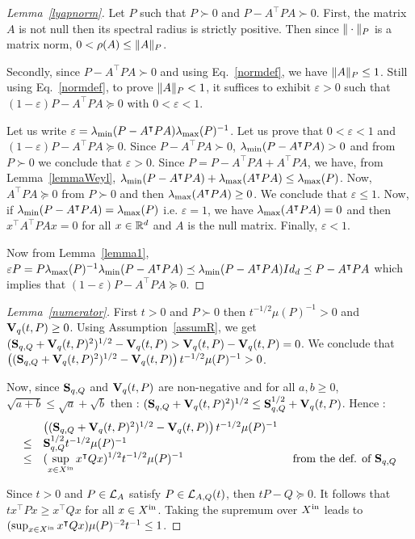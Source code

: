 \documentclass[10pt]{llncs}
\begin{document}
\begin{proof}[Lemma~\ref{lyapnorm}]
Let $P$ such that $P\succ 0$ and $P-A^\intercal P A\succ 0$.  First, the matrix $A$ is not null then its spectral radius is strictly positive. Then since $\| \cdot\|_P$ is a matrix norm, $0<\rho(A) \leq \| A\|_P$.

Secondly, since $P-A^\intercal P A\succ 0$ and using Eq.~\eqref{normdef}, we have $\| A\|_P\leq 1$. Still using Eq.~\eqref{normdef}, to prove $\| A\|_P<1$, it suffices to exhibit $\varepsilon>0$ such that $(1-\varepsilon) P-A^\intercal P A\succeq 0$ with $0<\varepsilon<1$. 

Let us write $\varepsilon=\lambda_{\operatorname{min}}(P-A^\intercal P A) \lambda_{\operatorname{max}}(P)^{-1}$. Let us prove that $0<\varepsilon<1$ and $(1-\varepsilon) P-A^\intercal P A\succeq 0$.  Since $P-A^\intercal P A\succ 0$, $\lambda_{\operatorname{min}}(P-A^\intercal P A)>0$ and from $P\succ 0$ we conclude that $\varepsilon >0$. Since $P=P-A^ \intercal P A +A^\intercal P A$, we have, from Lemma~\ref{lemmaWeyl}, $\lambda_{\operatorname{min}}(P-A^\intercal P A)+\lambda_{\operatorname{max}}(A^\intercal P A)\leq \lambda_{\operatorname{max}}(P)$. Now, $A^\intercal P A\succeq 0$ from $P\succ 0$ and then $\lambda_{\operatorname{max}}(A^\intercal P A)\geq 0$. We conclude that $\varepsilon\leq 1$. Now, if $\lambda_{\operatorname{min}}(P-A^\intercal P A)=\lambda_{\operatorname{max}}(P)$ i.e. $\varepsilon=1$, we have 
$\lambda_{\operatorname{max}}(A^\intercal P A)=0$ and then $x^\intercal A^\intercal P A x=0$ for all $x\in \mathbb R^d$ and $A$ is the null matrix. 
Finally, $\varepsilon<1$. 

Now from Lemma~\ref{lemma1}, $\varepsilon P=P\lambda_{\operatorname{max}}(P)^{-1}\lambda_{\operatorname{min}}(P-A^\intercal P A)\preceq \lambda_{\operatorname{min}}(P-A^\intercal P A)Id_d\preceq 
P-A^\intercal P A$ which implies that $(1-\varepsilon) P -A^\intercal P A\succeq 0$. 
\end{proof}

\begin{proof}[Lemma~\ref{numerator}]
First $t>0$ and $P\succ 0$ then $t^{-1/2}\mu(P)^{-1}>0$ and $\mathbf{V}_{q}(t,P)\geq 0$. Using Assumption~\ref{assumR}, we get $(\mathbf{S}_{q,Q}+\mathbf{V}_{q}(t,P)^2)^{1/2}-\mathbf{V}_{q}(t,P)> \mathbf{V}_{q}(t,P)-\mathbf{V}_{q}(t,P)=0$. We conclude that $\left((\mathbf{S}_{q,Q}+\mathbf{V}_{q}(t,P)^2)^{1/2}-\mathbf{V}_{q}(t,P)\right) t^{-1/2}\mu(P)^{-1}>0$. 

Now, since $\mathbf{S}_{q,Q}$ and $\mathbf{V}_{q}(t,P)$ are non-negative and for all $a,b\geq 0$, $\sqrt{a+b}\leq \sqrt{a}+\sqrt{b}$  then : 
$(\mathbf{S}_{q,Q}+\mathbf{V}_{q}(t,P)^2)^{1/2}\leq \mathbf{S}_{q,Q}^{1/2}+\mathbf{V}_{q}(t,P)$. Hence : 
\[
\begin{array}{lll}
&\left((\mathbf{S}_{q,Q}+\mathbf{V}_{q}(t,P)^2)^{1/2}-\mathbf{V}_{q}(t,P)\right) t^{-1/2}\mu(P)^{-1}& \\
\leq &\mathbf{S}_{q,Q}^{1/2} t^{-1/2}\mu(P)^{-1} & \\
\leq &(\displaystyle{\sup_{x\in X^\mathrm{in}} x^\intercal Q x})^{1/2} t^{-1/2}\mu(P)^{-1} & \text{ from the def. of } \mathbf{S}_{q,Q}
\end{array}
\]

Since $t>0$ and $P\in\mathcal{L}_{A}$ satisfy $P\in\mathcal{L}_{A,Q}(t)$, then $t P-Q\succeq 0$. It follows that 
$t x^\intercal P x\geq x^\intercal Q x$ for all $x\in X^\mathrm{in}$. Taking the supremum over $X^\mathrm{in}$ leads to $(\sup_{x\in X^\mathrm{in}} x^\intercal Q x)\mu(P)^{-2}t^{-1} \leq 1$. 
\end{proof}
\end{document}

